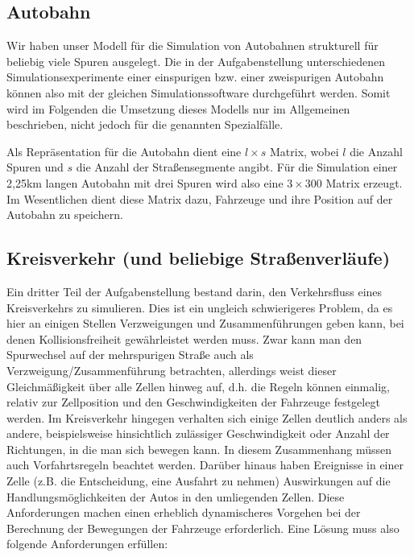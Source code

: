 \documentclass[11pt, a4paper]{article}
\begin{document}
\subsection{Autobahn}
\label{subsec:umsetzung-autobahn}

Wir haben unser Modell für die Simulation von Autobahnen strukturell für beliebig viele Spuren ausgelegt. Die in der Aufgabenstellung unterschiedenen Simulationsexperimente einer einspurigen bzw. einer zweispurigen Autobahn können also mit der gleichen Simulationssoftware durchgeführt werden. Somit wird im Folgenden die Umsetzung dieses Modells nur im Allgemeinen beschrieben, nicht jedoch für die genannten Spezialfälle.

Als Repräsentation für die Autobahn dient eine $l \times s$ Matrix, wobei $l$ die Anzahl Spuren und $s$ die Anzahl der Straßensegmente angibt. Für die Simulation einer 2,25km langen Autobahn mit drei Spuren wird also eine $3 \times 300$ Matrix erzeugt. Im Wesentlichen dient diese Matrix dazu, Fahrzeuge und ihre Position auf der Autobahn zu speichern.


\subsection{Kreisverkehr (und beliebige Straßenverläufe)}
\label{subsec:umsetzung-kreisverkehr}

Ein dritter Teil der Aufgabenstellung bestand darin, den Verkehrsfluss eines Kreisverkehrs zu simulieren. Dies ist ein ungleich schwierigeres Problem, da es hier an einigen Stellen Verzweigungen und Zusammenführungen geben kann, bei denen Kollisionsfreiheit gewährleistet werden muss. Zwar kann man den Spurwechsel auf der mehrspurigen Straße auch als Verzweigung/Zusammenführung betrachten, allerdings weist dieser Gleichmäßigkeit über alle Zellen hinweg auf, d.h. die Regeln können einmalig, relativ zur Zellposition und den Geschwindigkeiten der Fahrzeuge festgelegt werden. Im Kreisverkehr hingegen verhalten sich einige Zellen deutlich anders als andere, beispielsweise hinsichtlich zulässiger Geschwindigkeit oder Anzahl der Richtungen, in die man sich bewegen kann. In diesem Zusammenhang müssen auch Vorfahrtsregeln beachtet werden. Darüber hinaus haben Ereignisse in einer Zelle (z.B. die Entscheidung, eine Ausfahrt zu nehmen) Auswirkungen auf die Handlungsmöglichkeiten der Autos in den umliegenden Zellen. Diese Anforderungen machen einen erheblich dynamischeres Vorgehen bei der Berechnung der Bewegungen der Fahrzeuge erforderlich. Eine Lösung muss also folgende Anforderungen erfüllen:
\end{document}
